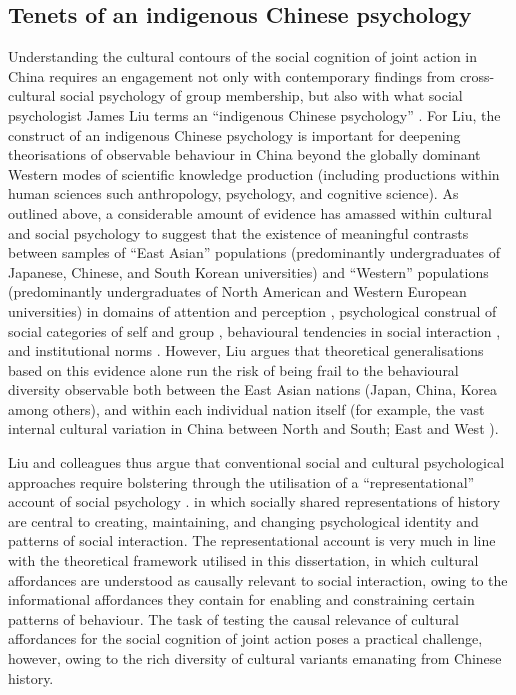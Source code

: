 \begin{CJK}{UTF8}{gbsn}
\subsection{Tenets of an indigenous Chinese psychology\label{sect:indigPsych}}
Understanding the cultural contours of the social cognition of joint action in China requires an engagement not only with contemporary findings from cross-cultural social psychology of group membership, but also with what social psychologist James Liu terms an ``indigenous Chinese psychology'' \citep{Triandis1996,Liu2009}.  For Liu, the construct of an indigenous Chinese psychology is important for deepening theorisations of observable behaviour in China beyond the globally dominant Western modes of scientific knowledge production (including productions within human sciences such anthropology, psychology, and cognitive science).  As outlined above, a considerable amount of evidence has amassed within cultural and social psychology to suggest that the existence of meaningful contrasts between samples of ``East Asian'' populations (predominantly undergraduates of Japanese, Chinese, and South Korean universities) and ``Western'' populations (predominantly undergraduates of North American and Western European universities) in domains of attention and perception \citep{Peng1997,Nisbett2003}, psychological construal of social categories of self and group \citep{Markus1991}, behavioural tendencies in social interaction \citep{Yuki2003}, and institutional norms \citep{Liu2017}.
However, Liu argues that theoretical generalisations based on this evidence alone run the risk of being frail to the behavioural diversity observable both between the East Asian nations (Japan, China, Korea among others), and within each individual nation itself (for example, the vast internal cultural variation in China between North and South; East and West \citep[see, for example,][]{Henrich2014}).

Liu and colleagues thus argue that conventional social and cultural psychological approaches require bolstering through the utilisation of a ``representational'' account of social psychology \citep{Liu2005}. in which socially shared representations of history are central to creating, maintaining, and changing psychological identity and patterns of social interaction.  The representational account is very much in line with the theoretical framework utilised in this dissertation, in which cultural affordances are understood as causally relevant to social interaction, owing to the informational affordances they contain for enabling and constraining certain patterns of behaviour.  The task of testing the causal relevance of cultural affordances for the social cognition of joint action poses a practical challenge, however, owing to the rich diversity of cultural variants emanating from Chinese history.


\end{CJK}
